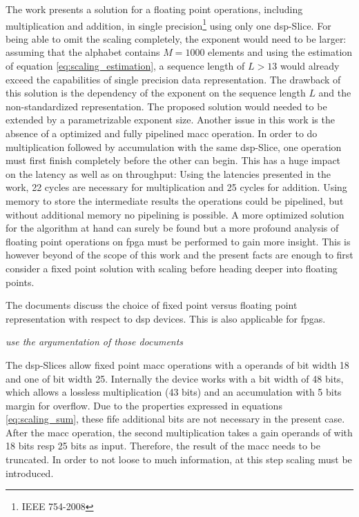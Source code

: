 \documentclass[mscthesis]{usiinfthesis}
\begin{document}
The work \cite{FPL13_Brosser} presents a solution for a floating point
operations, including multiplication and addition, in single
precision\footnote{IEEE 754-2008} using only one \gls{dsp}-Slice. For being able to
omit the scaling completely, the exponent would need to be larger: assuming
that the alphabet contains $M=1000$ elements and using the estimation of
equation \ref{eq:scaling_estimation}, a sequence length of $L>13$ would already
exceed the capabilities of single precision data representation. The drawback
of this solution is the dependency of the exponent on the sequence length $L$
and the non-standardized representation. The proposed solution would needed to
be extended by a parametrizable exponent size. Another issue in this work is
the absence of a optimized and fully pipelined \gls{macc} operation.
In order to do multiplication followed by accumulation with the same \gls{dsp}-Slice,
one operation must first finish completely before the other can begin. This has
a huge impact on the latency as well as on throughput: Using the latencies
presented in the work, 22 cycles are necessary for multiplication and 25 cycles
for addition. Using memory to store the intermediate results the operations
could be pipelined, but without additional memory no pipelining is possible.
A more optimized solution for the algorithm at hand can surely be found but
a more profound analysis of floating point operations on \gls{fpga} must be performed
to gain more insight. This is however beyond of the scope of this work and the
present facts are enough to first consider a fixed point solution with scaling
before heading deeper into floating points.

The documents \cite{smith97, ti04} discuss the choice of fixed point versus
floating point representation with respect to \gls{dsp} devices. This is also
applicable for \glspl{fpga}.

\emph{\color{red} use the argumentation of those documents}

The \gls{dsp}-Slices allow fixed point \gls{macc} operations with a operands
of bit width 18 and one of bit width 25. Internally the device works with a bit
width of 48 bits, which allows a lossless multiplication (43 bits) and an
accumulation with 5 bits margin for overflow. Due to the properties expressed in
equations \ref{eq:scaling_sum}, these fife additional bits are not necessary in
the present case. After the \gls{macc} operation, the second multiplication takes
a gain operands of with 18 bits resp 25 bits as input. Therefore, the result of
the \gls{macc} needs to be truncated. In order to not loose to much information, at
this step scaling must be introduced.
\end{document}
